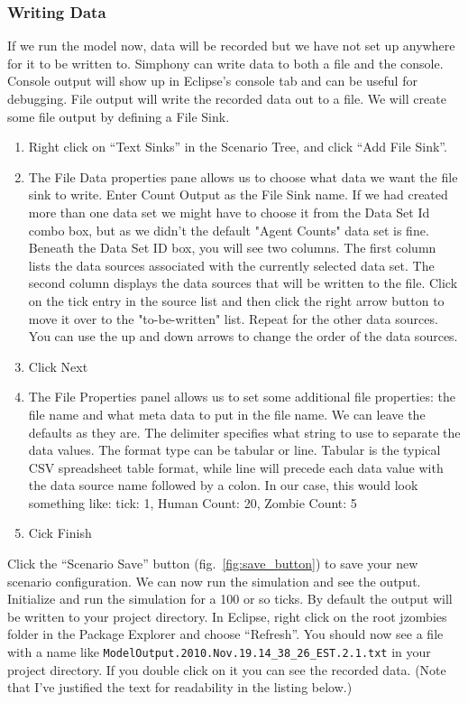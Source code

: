 \documentclass[11pt]{amsart}
\begin{document}
\subsubsection{Writing Data}

If we run the model now, data will be recorded but we have not set up anywhere for it to be written to.  Simphony can write data to both a file and the console. Console output will show up in Eclipse's console tab and can be useful for debugging. File output will write the recorded data out to a file. We will create some file output by defining a File Sink. 

\vspace{.2in}
\begin{enumerate}
\item Right click on ``Text Sinks'' in the Scenario Tree, and click ``Add File Sink''. 
\item The File Data properties pane allows us to choose what data we want the file sink to write. Enter Count Output as the File Sink name. If we had created more than one data set we might have to choose it from the Data Set Id combo box, but as we didn't the default "Agent Counts" data set is fine. Beneath the Data Set ID box, you will see two columns. The first column lists the data sources associated with the currently selected data set. The second column displays the data sources that will be written to the file. Click on the tick entry in the source list and then click the right arrow button to move it over to the "to-be-written" list. Repeat for the other data sources. You can use the up and down arrows to change the order of the data sources.
\item Click Next
\item The File Properties panel allows us to set some additional file properties: the file name and what meta data to put in the file name. We can leave the defaults as they are. The delimiter specifies what string to use to separate the data values. The format type can be tabular or line. Tabular is the typical CSV spreadsheet table format, while line will precede each data value with the data source name followed by a colon. In our case, this would look something like: tick: 1, Human Count: 20, Zombie Count: 5
\item Cick Finish
\end{enumerate}
\vspace{.2in}

Click the ``Scenario Save''  button (fig.~\ref{fig:save_button}) to save your new scenario configuration. We can now run the simulation and see the output. Initialize and run the simulation for a 100 or so ticks. By default the output will be written to your project directory. In Eclipse, right click on the root jzombies folder in the Package Explorer and choose ``Refresh''. You should now see a file with a name like \texttt{ModelOutput.2010.Nov.19.14\_38\_26\_EST.2.1.txt} in your project directory. If you double click on it you can see the recorded data. (Note that I've justified the text for readability in the listing below.)
\end{document}
